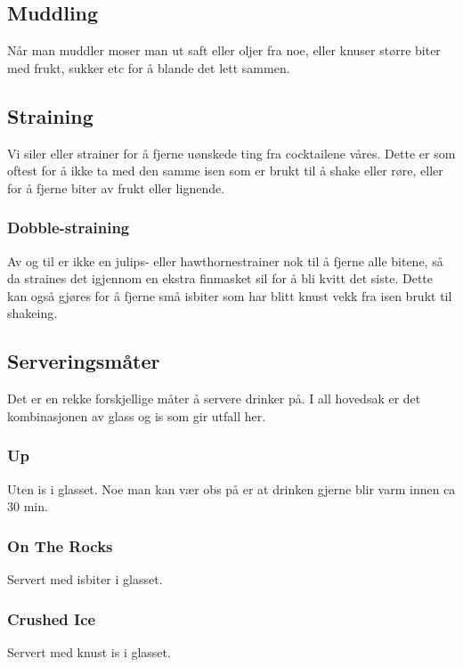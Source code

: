 \subsection{Muddling}
Når man muddler moser man ut saft eller oljer fra noe, eller knuser større biter med frukt, sukker etc for å blande det lett sammen.
\subsection{Straining}
Vi siler eller strainer for å fjerne uønskede ting fra cocktailene våres. Dette er som oftest for å ikke ta med den samme isen som er brukt til å shake eller røre, eller for å fjerne biter av frukt eller lignende. 

\subsubsection{Dobble-straining}
Av og til er ikke en julips- eller hawthornestrainer nok til å fjerne alle bitene, så da straines det igjennom en ekstra finmasket sil for å bli kvitt det siste. Dette kan også gjøres for å fjerne små isbiter som har blitt knust vekk fra isen brukt til shakeing.

\subsection{Serveringsmåter}
Det er en rekke forskjellige måter å servere drinker på. I all hovedsak er det kombinasjonen av glass og is som gir utfall her.

\subsubsection{Up}
Uten is i glasset. Noe man kan vær obs på er at drinken gjerne blir varm innen ca 30 min.
\subsubsection{On The Rocks}
Servert med isbiter i glasset.
\subsubsection{Crushed Ice}
Servert med knust is i glasset.